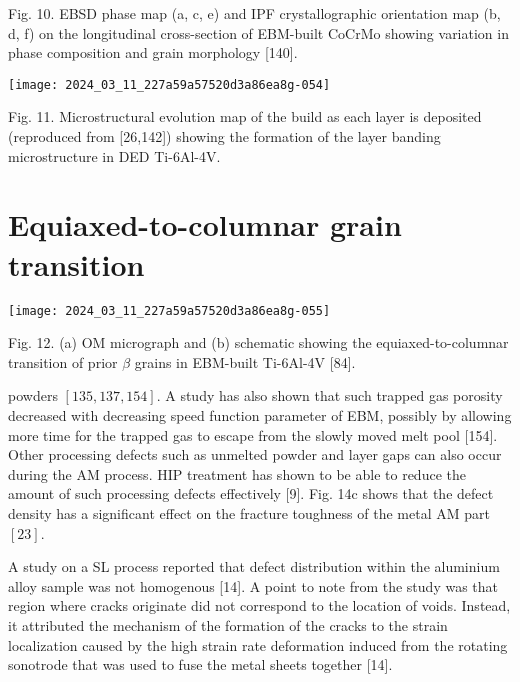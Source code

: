 \documentclass[10pt]{article}
\begin{document}
Fig. 10. EBSD phase map (a, c, e) and IPF crystallographic orientation map (b, d, f) on the longitudinal cross-section of EBM-built CoCrMo showing variation in phase composition and grain morphology [140].

\begin{center}
\texttt{[image: 2024\_03\_11\_227a59a57520d3a86ea8g-054]}
\end{center}

Fig. 11. Microstructural evolution map of the build as each layer is deposited (reproduced from [26,142]) showing the formation of the layer banding microstructure in DED Ti-6Al-4V.

\section*{Equiaxed-to-columnar grain transition}
\begin{center}
\texttt{[image: 2024\_03\_11\_227a59a57520d3a86ea8g-055]}
\end{center}

Fig. 12. (a) OM micrograph and (b) schematic showing the equiaxed-to-columnar transition of prior $\beta$ grains in EBM-built Ti-6Al-4V [84].

powders $[135,137,154]$. A study has also shown that such trapped gas porosity decreased with decreasing speed function parameter of EBM, possibly by allowing more time for the trapped gas to escape from the slowly moved melt pool [154]. Other processing defects such as unmelted powder and layer gaps can also occur during the AM process. HIP treatment has shown to be able to reduce the amount of such processing defects effectively [9]. Fig. 14c shows that the defect density has a significant effect on the fracture toughness of the metal AM part $[23]$.

A study on a SL process reported that defect distribution within the aluminium alloy sample was not homogenous [14]. A point to note from the study was that region where cracks originate did not correspond to the location of voids. Instead, it attributed the mechanism of the formation of the cracks to the strain localization caused by the high strain rate deformation induced from the rotating sonotrode that was used to fuse the metal sheets together [14].
\end{document}
